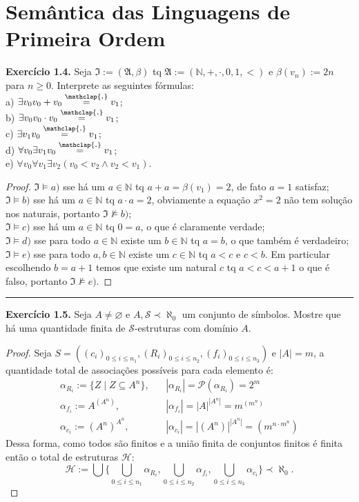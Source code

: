 \documentclass[11pt]{article}
\theoremstyle{definition}
\newcommand{\mc}[1]{\mathcal{#1}}
\newcommand{\mf}[1]{\mathfrak{#1}}
\newcommand{\mbb}[1]{\mathbb{#1}}
\newcommand\overtext[2]{\stackrel{\mathclap{\normalfont\mbox{#1}}}{#2}}
\begin{document}
\section{Semântica das Linguagens de Primeira Ordem}

\textbf{Exercício 1.4.} Seja $\mf{I}:=(\mf{A},\beta)$ tq $\mf{A}:=(\mbb{N},+,\cdot,0,1,<)$ e $\beta(v_n):=2n$ para $n\ge0$. Interprete as seguintes fórmulas:\\
a) $\exists v_0v_0+v_0\overtext{.}{=} v_1$;\\
b) $\exists v_0v_0\cdot v_0\overtext{.}{=} v_1$;\\
c) $\exists v_1v_0\overtext{.}{=} v_1$;\\
d) $\forall v_0\exists v_1v_0\overtext{.}{=} v_1$;\\
e) $\forall v_0\forall v_1\exists v_2(v_0<v_2\wedge v_2<v_1)$.

\begin{proof}
    $\mf{I}\vDash a)$ sse há um $a\in\mbb{N}$ tq $a+a=\beta(v_1)=2$, de fato $a=1$ satisfaz;\\
    $\mf{I}\vDash b)$ sse há um $a\in\mbb{N}$ tq $a\cdot a=2$, obviamente a equação $x^2=2$ não tem solução nos naturais, portanto $\mf{I}\nvDash b)$;\\
    $\mf{I}\vDash c)$ sse há um $a\in\mbb{N}$ tq $0=a$, o que é claramente verdade;\\
    $\mf{I}\vDash d)$ sse para todo $a\in\mbb{N}$ existe um $b\in\mbb{N}$ tq $a = b$, o que também é verdadeiro;\\
    $\mf{I}\vDash e)$ sse para todo $a,b\in\mbb{N}$ existe um $c\in\mbb{N}$ tq $a<c$ e $c<b$. Em particular escolhendo $b = a+1$ temos que existe um natural $c$ tq $a < c < a+1$ o que é falso, portanto $\mf{I}\nvDash e)$.
\end{proof}

\hrule

\textbf{Exercício 1.5.} Seja $A\ne\varnothing$ e $A,\mc{S}\prec\aleph_0$ um conjunto de símbolos. Mostre que há uma quantidade finita de $\mc{S}$-estruturas com domínio $A$.

\begin{proof}
Seja $S=((c_i)_{0\le i\le n_1},(R_i)_{0\le i\le n_2},(f_i)_{0\le i\le n_3})$ e $|A|=m$, a quantidade total de associações possíveis para cada elemento é:
\begin{align*}
    \alpha_{R_i} :=\{Z\mid Z\subseteq A^n\}, & ~~~~|\alpha_{R_i}| =\mc{P}(\alpha_{R_i}) = 2^m\\
    \alpha_{f_i} :=A^{\left(A^n\right)}, & ~~~~|\alpha_{f_i}| = |A|^{|A^n|} = m^{\left(m^n\right)}\\
    \alpha_{c_i} :=\left(A^n\right)^{A^n}, & ~~~~|\alpha_{c_i}| = |\left(A^n\right)|^{|A^n|} = \left(m^{n\cdot m^n}\right)
\end{align*}
Dessa forma, como todos são finitos e a união finita de conjuntos finitos é finita então o total de estruturas $\mc{H}$:
\[
\mc{H}:=\bigcup\Biggl\{\bigcup_{0\le i\le n_1}\alpha_{R_i},\bigcup_{0\le i\le n_2}\alpha_{f_i},\bigcup_{0\le i\le n_3}\alpha_{c_i}\Biggr\}\prec\aleph_0.
\]
\end{proof}
\end{document}
